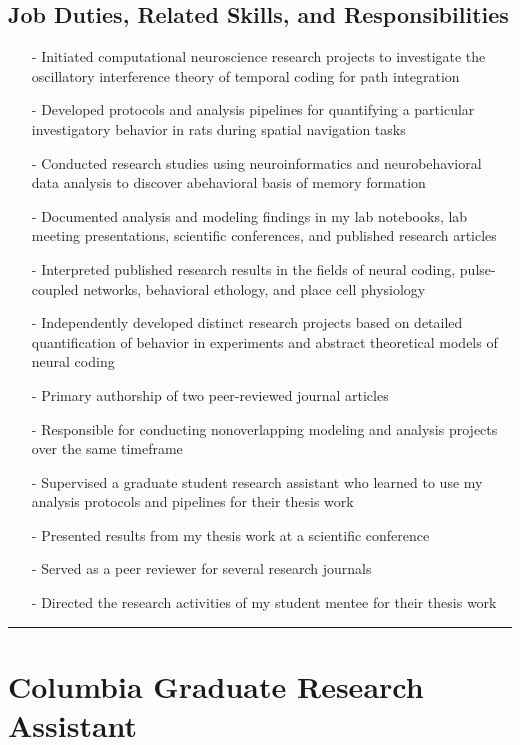 \documentclass[10pt]{article}
\begin{document}
\subsection*{Job Duties, Related Skills, and Responsibilities}

\begin{itemize}
  \item[-] Initiated computational neuroscience research projects to investigate the oscillatory interference theory of temporal coding for path integration
  \item[-] Developed protocols and analysis pipelines for quantifying a particular investigatory behavior in rats during spatial navigation tasks
  \item[-] Conducted research studies using neuroinformatics and neurobehavioral data analysis to discover abehavioral basis of memory formation
  \item[-] Documented analysis and modeling findings in my lab notebooks, lab meeting presentations, scientific conferences, and published research articles
  \item[-] Interpreted published research results in the fields of neural coding, pulse-coupled networks, behavioral ethology, and place cell physiology
  \item[-] Independently developed distinct research projects based on detailed quantification of behavior in experiments and abstract theoretical models of neural coding
  \item[-] Primary authorship of two peer-reviewed journal articles
  \item[-] Responsible for conducting nonoverlapping modeling and analysis projects over the same timeframe
  \item[-] Supervised a graduate student research assistant who learned to use my analysis protocols and pipelines for their thesis work
  \item[-] Presented results from my thesis work at a scientific conference
  \item[-] Served as a peer reviewer for several research journals
  \item[-] Directed the research activities of my student mentee for their thesis work
\end{itemize}



\pagebreak
\hrule
\section{Columbia Graduate Research Assistant}
\label{sec:job4}
\end{document}
